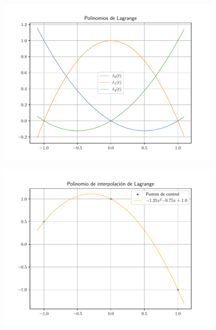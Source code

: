 \begin{frame}
	\begin{solution}
		\begin{figure}[ht!]
			\centering
			\includegraphics[width=.8\paperwidth]{p6_lagrange}
		\end{figure}
	\end{solution}
\end{frame}


\begin{frame}
	\begin{solution}
		\begin{figure}[ht!]
			\centering
			\includegraphics[width=.8\paperwidth]{p6}
		\end{figure}
	\end{solution}
\end{frame}